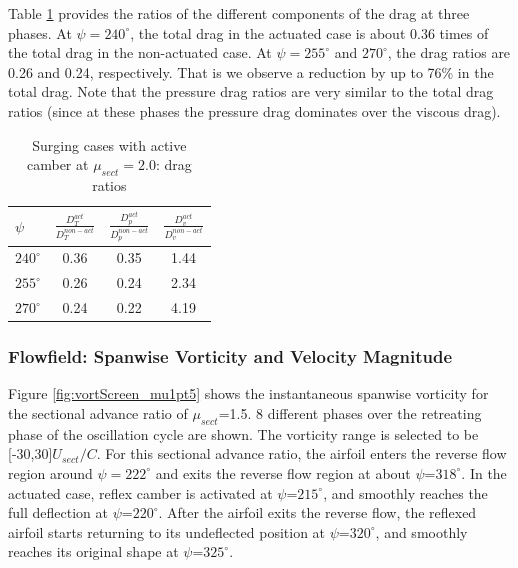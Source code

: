 Table \ref{table:D_ratios_mu_2pt0} provides the ratios of the different components of the drag at three phases. At $\psi=240^\circ$, the total drag in the actuated case is about 0.36 times of the total drag in the non-actuated case. At $\psi=255^\circ$ and $270^\circ$, the drag ratios are 0.26 and 0.24, respectively. That is we observe a reduction by up to 76\% in the total drag.
Note that the pressure drag ratios are very similar to the total drag ratios (since at these phases the pressure drag dominates over the viscous drag).

\begin{table}[H]
		\vspace{0cm}
		\centering
		\caption{Surging cases with active camber at $\mu_{sect} = 2.0$: drag ratios}
		\label{table:D_ratios_mu_2pt0}
		\begin{tabular}{|l|c|c|c|}
			\hline
			$ \psi$   & {\large $\frac{D^{act}_{T}}{D^{non-act}_{T}}$} & {\large $\frac{D^{act}_{p}}{D^{non-act}_{p}}$} & {\large $\frac{D^{act}_{v}}{D^{non-act}_{v}}$} \\
			\hline
			\hline
			$240^\circ$ & 0.36 & 0.35 & 1.44   \\
			\hline
			$255^\circ$ & 0.26 & 0.24 & 2.34   \\
			\hline
			$270^\circ$ & 0.24 & 0.22 & 4.19   \\
			\hline
		\end{tabular}
	\end{table}

\subsubsection{Flowfield: Spanwise Vorticity and Velocity Magnitude}
Figure \ref{fig:vortScreen_mu1pt5} shows the instantaneous spanwise vorticity for the sectional advance ratio of $\mu_{sect}$=1.5.
8 different phases over the retreating phase of the oscillation cycle are shown. The vorticity range is selected to be [-30,30]$ U_{sect}/C$. For this sectional advance ratio, the airfoil enters the reverse flow region around $\psi=222^\circ$ and exits the reverse flow region at about $\psi$=$318^\circ$. In the actuated case, reflex camber is activated at $\psi$=$215^\circ$, and smoothly reaches the full deflection at $\psi$=$220^\circ$. After the airfoil exits the reverse flow, the reflexed airfoil starts returning to its undeflected position at $\psi$=$320^\circ$, and smoothly reaches its original shape at $\psi$=$325^\circ$.


